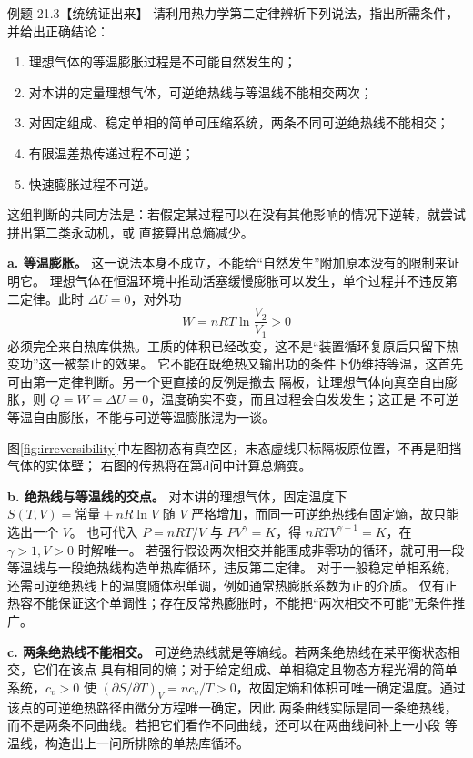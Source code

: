 \begin{origexamplebox}{例题 21.3【统统证出来】}
请利用热力学第二定律辨析下列说法，指出所需条件，并给出正确结论：
\begin{enumerate}[label=\alph*.]
  \item 理想气体的等温膨胀过程是不可能自然发生的；
  \item 对本讲的定量理想气体，可逆绝热线与等温线不能相交两次；
  \item 对固定组成、稳定单相的简单可压缩系统，两条不同可逆绝热线不能相交；
  \item 有限温差热传递过程不可逆；
  \item 快速膨胀过程不可逆。
\end{enumerate}
\end{origexamplebox}

\begin{xesolution}
这组判断的共同方法是：若假定某过程可以在没有其他影响的情况下逆转，就尝试拼出第二类永动机，或
直接算出总熵减少。

\textbf{a. 等温膨胀。} 这一说法本身不成立，不能给“自然发生”附加原本没有的限制来证明它。
理想气体在恒温环境中推动活塞缓慢膨胀可以发生，单个过程并不违反第二定律。此时 $\Delta U=0$，对外功
\[
  W=nRT\ln\frac{V_2}{V_1}>0
\]
必须完全来自热库供热。工质的体积已经改变，这不是“装置循环复原后只留下热变功”这一被禁止的效果。
它不能在既绝热又输出功的条件下仍维持等温，这首先可由第一定律判断。另一个更直接的反例是撤去
隔板，让理想气体向真空自由膨胀，则 $Q=W=\Delta U=0$，温度确实不变，而且过程会自发发生；这正是
不可逆等温自由膨胀，不能与可逆等温膨胀混为一谈。

\irreversibleProcessesDiagram
{}\label{fig:irreversibility}
图\ref{fig:irreversibility}中左图初态有真空区，末态虚线只标隔板原位置，不再是阻挡气体的实体壁；
右图的传热将在第d问中计算总熵变。

\textbf{b. 绝热线与等温线的交点。} 对本讲的理想气体，固定温度下
$S(T,V)=\text{常量}+nR\ln V$ 随 $V$ 严格增加，而同一可逆绝热线有固定熵，故只能选出一个 $V$。
也可代入 $P=nRT/V$ 与 $PV^\gamma=K$，得 $nRTV^{\gamma-1}=K$，在 $\gamma>1,V>0$ 时解唯一。
若强行假设两次相交并能围成非零功的循环，就可用一段等温线与一段绝热线构造单热库循环，违反第二定律。
对于一般稳定单相系统，还需可逆绝热线上的温度随体积单调，例如通常热膨胀系数为正的介质。
仅有正热容不能保证这个单调性；存在反常热膨胀时，不能把“两次相交不可能”无条件推广。

\textbf{c. 两条绝热线不能相交。} 可逆绝热线就是等熵线。若两条绝热线在某平衡状态相交，它们在该点
具有相同的熵；对于给定组成、单相稳定且物态方程光滑的简单系统，$c_v>0$ 使
$(\partial S/\partial T)_V=nc_v/T>0$，故固定熵和体积可唯一确定温度。通过该点的可逆绝热路径由微分方程唯一确定，因此
两条曲线实际是同一条绝热线，而不是两条不同曲线。若把它们看作不同曲线，还可以在两曲线间补上一小段
等温线，构造出上一问所排除的单热库循环。


\end{xesolution}
